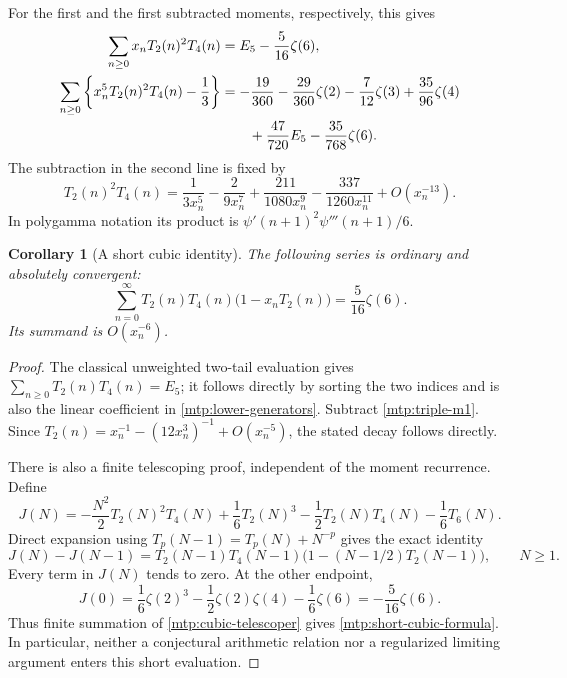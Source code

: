 \documentclass[11pt,letterpaper]{article}
\numberwithin{equation}{section}
\newtheorem{corollary}[theorem]{Corollary}
\theoremstyle{definition}
\theoremstyle{remark}
\begin{document}
For the first and the first subtracted moments, respectively, this gives
\begin{align}
 \sum_{n\ge0}x_nT_2(n)^2T_4(n)
  &=E_5-\frac5{16}\zeta(6),\label{mtp:triple-m1}\\
 \sum_{n\ge0}\left\{x_n^5T_2(n)^2T_4(n)-\frac13\right\}
  &=-\frac{19}{360}-\frac{29}{360}\zeta(2)-\frac7{12}\zeta(3)
       +\frac{35}{96}\zeta(4)\notag\\
  &\qquad+\frac{47}{720}E_5-\frac{35}{768}\zeta(6).
       \label{mtp:triple-m5}
\end{align}
The subtraction in the second line is fixed by
\[
 T_2(n)^2T_4(n)=\frac1{3x_n^5}-\frac2{9x_n^7}
                    +\frac{211}{1080x_n^9}-\frac{337}{1260x_n^{11}}
                    +O(x_n^{-13}).
\]
In polygamma notation its product is
$\psi'(n+1)^2\psi'''(n+1)/6$.

\begin{corollary}[A short cubic identity]
\label{mtp:short-cubic}
The following series is ordinary and absolutely convergent:
\begin{equation}\label{mtp:short-cubic-formula}
 \boxed{\sum_{n=0}^{\infty}T_2(n)T_4(n)
                     \bigl(1-x_nT_2(n)\bigr)=\frac5{16}\zeta(6).}
\end{equation}
Its summand is $O(x_n^{-6})$.
\end{corollary}

\begin{proof}
The classical unweighted two-tail evaluation gives
$\sum_{n\ge0}T_2(n)T_4(n)=E_5$; it follows directly by sorting the
two indices and is also the linear coefficient in
\eqref{mtp:lower-generators}. Subtract \eqref{mtp:triple-m1}.
Since $T_2(n)=x_n^{-1}-(12x_n^3)^{-1}+O(x_n^{-5})$, the stated
decay follows directly.

There is also a finite telescoping proof, independent of the moment
recurrence. Define
\[
 J(N)=-\frac{N^2}{2}T_2(N)^2T_4(N)+\frac16T_2(N)^3
            -\frac12T_2(N)T_4(N)-\frac16T_6(N).
\]
Direct expansion using $T_p(N-1)=T_p(N)+N^{-p}$ gives the exact identity
\begin{equation}\label{mtp:cubic-telescoper}
 J(N)-J(N-1)=T_2(N-1)T_4(N-1)
                    \bigl(1-(N-1/2)T_2(N-1)\bigr),\qquad N\ge1.
\end{equation}
Every term in $J(N)$ tends to zero. At the other endpoint,
\[
 J(0)=\frac16\zeta(2)^3-\frac12\zeta(2)\zeta(4)-\frac16\zeta(6)
             =-\frac5{16}\zeta(6).
\]
Thus finite summation of \eqref{mtp:cubic-telescoper} gives
\eqref{mtp:short-cubic-formula}. In particular, neither a conjectural
arithmetic relation nor a regularized limiting argument enters this
short evaluation.
\end{proof}
\end{document}

